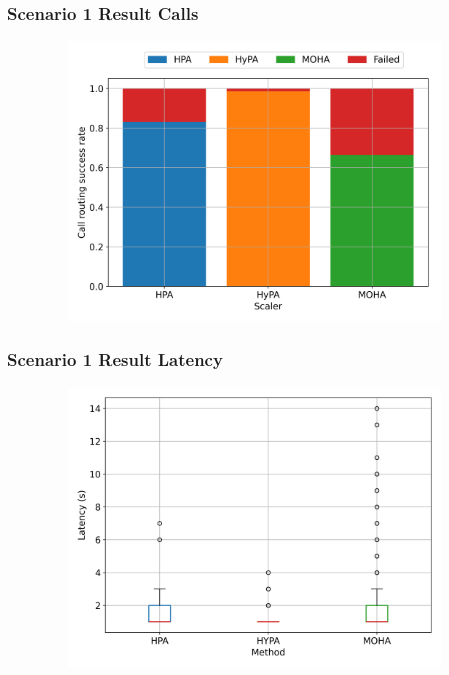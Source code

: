 \documentclass[11pt,t,usepdftitle=false,aspectratio=169]{beamer}
\begin{document}
\begin{frame}
	\frametitle{Scenario 1 Result Calls}
	\begin{figure}
		\centering
		\vspace*{-0.5cm}
		\includegraphics[width=11cm,height=7.4cm]{_images/scenario_1/call_comparison.png}
	\end{figure}
\end{frame}

\begin{frame}
	\frametitle{Scenario 1 Result Latency}
	\begin{figure}
		\centering
		\vspace*{-0.5cm}
		\includegraphics[width=11cm,height=7.4cm]{_images/scenario_1/latency.png}
	\end{figure}
\end{frame}
\end{document}

